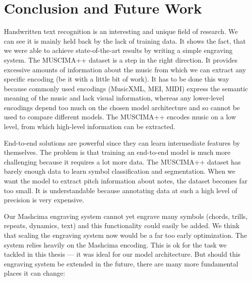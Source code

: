 \chapter{Conclusion and Future Work}
\label{chap:ConclusionAndFutureWork}

Handwritten text recognition is an interesting and unique field of research. We can see it is mainly held back by the lack of training data. It shows the fact, that we were able to achieve state-of-the-art results by writing a simple engraving system. The MUSCIMA++ dataset is a step in the right direction. It provides excessive amounts of information about the music from which we can extract any specific encoding (be it with a little bit of work). It has to be done this way because commonly used encodings (MusicXML, MEI, MIDI) express the semantic meaning of the music and lack visual information, whereas any lower-level encodings depend too much on the chosen model architecture and so cannot be used to compare different models. The MUSCIMA++ encodes music on a low level, from which high-level information can be extracted.

End-to-end solutions are powerful since they can learn intermediate features by themselves. The problem is that training an end-to-end model is much more challenging because it requires a lot more data. The MUSCIMA++ dataset has barely enough data to learn symbol classification and segmentation. When we want the model to extract pitch information about notes, the dataset becomes far too small. It is understandable because annotating data at such a high level of precision is very expensive.

Our Mashcima engraving system cannot yet engrave many symbols (chords, trills, repeats, dynamics, text) and this functionality could easily be added. We think that scaling the engraving system now would be a far too early optimization. The system relies heavily on the Mashcima encoding. This is ok for the task we tackled in this thesis --- it was ideal for our model architecture. But should this engraving system be extended in the future, there are many more fundamental places it can change:

